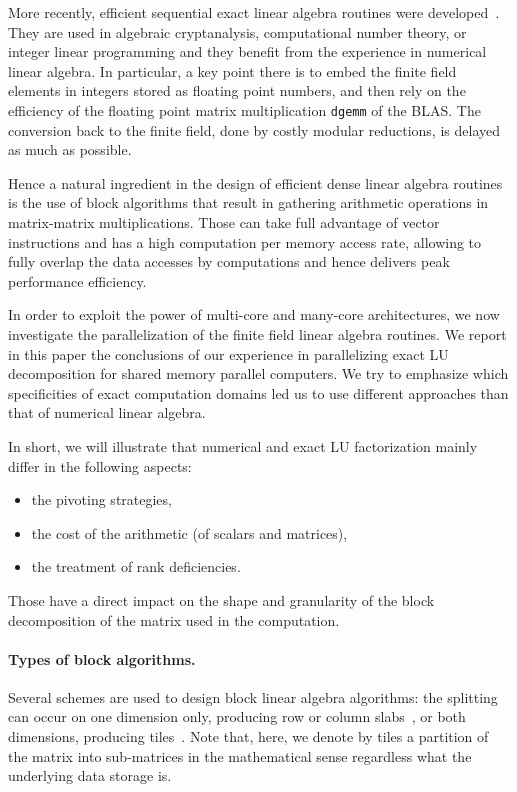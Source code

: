 \documentclass{article}
\begin{document}
More recently, efficient sequential exact linear algebra
routines were developed~\cite{DGP08}. They are used in algebraic cryptanalysis, computational number theory, or integer linear programming and they benefit from the experience in numerical linear
algebra. In particular, a key point there is to embed the finite field elements
in integers stored as floating point numbers, and then rely  on the efficiency of the
floating point matrix multiplication \texttt{dgemm} of the BLAS. The conversion
back to the finite field, done by costly modular reductions, is delayed as much as possible.
 
Hence a natural ingredient in the design of efficient dense linear algebra routines is the
use of block algorithms that result in gathering arithmetic operations in
matrix-matrix multiplications. Those can take full advantage of vector instructions and has a high computation
per memory access rate, allowing to fully overlap the data accesses by
computations and hence delivers peak performance efficiency.
 
In order to exploit the power of multi-core and many-core architectures, we now
investigate the parallelization of the finite field linear algebra routines. 
We report in this paper the conclusions of our experience in parallelizing
exact LU decomposition for shared memory parallel computers. We try to emphasize
which specificities of exact computation domains led us to use different
approaches than that of numerical linear algebra.
 
In short, we will illustrate that numerical and exact LU factorization mainly differ in the 
following aspects:
\vspace{-3mm}
\begin{itemize}
\item the pivoting strategies,
\item the cost of the arithmetic (of scalars and matrices),
\item the treatment of rank deficiencies.
\end{itemize}
\vspace{-2mm}
Those have a direct impact on the shape and granularity of the block
decomposition of the matrix used in the computation.

 
 

\vspace{-1em}
\paragraph{Types of block algorithms.}
Several schemes are used to design block linear algebra algorithms: the splitting can occur on one
dimension only, producing row or column slabs~\cite{KlvdGe95}, or both
dimensions, producing tiles~\cite{BLKD07}. Note that, here, we denote by tiles a
partition of the matrix into sub-matrices in the mathematical sense regardless
what the underlying data storage is. 
 
\end{document}
